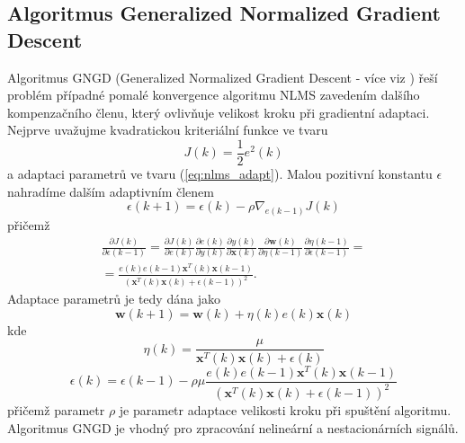 \subsection{Algoritmus Generalized Normalized Gradient Descent}\label{chap:gngd}
Algoritmus GNGD (Generalized Normalized Gradient Descent - více viz \cite{haykin}) řeší problém případné pomalé konvergence algoritmu NLMS zavedením dalšího kompenzačního členu, který ovlivňuje velikost kroku při gradientní adaptaci. Nejprve uvažujme kvadratickou kriteriální funkce ve tvaru
\begin{equation}
    J(k)=\frac{1}{2}e^2(k)
\end{equation}
a adaptaci parametrů ve tvaru (\ref{eq:nlms_adapt}). Malou pozitivní konstantu $\epsilon$ nahradíme dalším adaptivním členem
\begin{equation}
    \epsilon(k+1)=\epsilon(k)-\rho \nabla_{e(k-1)}J(k)
\end{equation}
přičemž
\begin{multline}
    \frac{\partial J(k)}{\partial \epsilon(k-1)}=\frac{\partial J(k)}{\partial e(k)}\frac{\partial e(k)}{\partial y(k)}\frac{\partial y(k)}{\partial \textbf{x}(k)}\frac{\partial \textbf{w}(k)}{\partial \eta(k-1)}\frac{\partial \eta(k-1)}{\partial \epsilon(k-1)}= \\
    =\frac{e(k)e(k-1)\textbf{x}^T(k)\textbf{x}(k-1)}{(\textbf{x}^T(k)\textbf{x}(k)+\epsilon(k-1))^2}.
\end{multline}
Adaptace parametrů je tedy dána jako
\begin{equation}
    \textbf{w}(k+1)=\textbf{w}(k)+\eta(k)e(k)\textbf{x}(k)
\end{equation}
kde
\begin{equation}
    \eta(k)=\frac{\mu}{\textbf{x}^T(k)\textbf{x}(k)+\epsilon(k)}
\end{equation}
\begin{equation}
    \epsilon(k)=\epsilon(k-1)-\rho\mu\frac{e(k)e(k-1)\textbf{x}^T(k)\textbf{x}(k-1)}{(\textbf{x}^T(k)\textbf{x}(k)+\epsilon(k-1))^2}
\end{equation}
přičemž parametr $\rho$ je parametr adaptace velikosti kroku při spuštění algoritmu. Algoritmus GNGD je vhodný pro zpracování nelineární a nestacionárních signálů.

